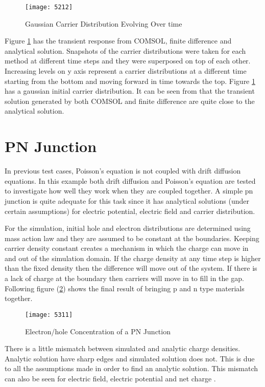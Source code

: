 \begin{doublespace}
\begin{figure}[ht]
\centering
\texttt{[image: 5212]}
\caption{Gaussian Carrier Distribution Evolving Over time} 
\label{51}
\end{figure}

Figure \ref{51} has the transient response from COMSOL, finite difference and analytical solution. Snapshots of the carrier distributions were taken for each method at different time steps and they were superposed on top of each other. Increasing levels on y axis represent a carrier distributions at a different time starting from the bottom and moving forward in time towards the top. Figure \ref{51} has a gaussian initial carrier distribution. It can be seen from that the transient solution generated by both COMSOL and finite difference are quite close to the analytical solution.


\clearpage
\section{PN Junction}
In previous test cases, Poisson's equation is not coupled with drift diffusion equations. In this example both drift diffusion and Poisson's equation are tested to investigate how well they work when they are coupled together. A simple pn junction is quite adequate for this task since it has analytical solutions (under certain assumptions) for electric potential, electric field and carrier distribution.

For the simulation, initial hole and electron distributions are determined using mass action law and they are assumed to be constant at the boundaries. Keeping carrier density constant creates a mechanism in which the charge can move in and out of the simulation domain. If the charge density at any time step is higher than the fixed density then the difference will move out of the system. If there is a lack of charge at the boundary then carriers will move in to fill in the gap. Following figure (\ref{npcon}) shows the final result of bringing p and n type materials together. 
 
\begin{figure}[ht]
\centering
\texttt{[image: 5311]}
\caption{Electron/hole Concentration of a PN Junction} 
\label{npcon}
\end{figure}

There is a little mismatch between simulated and analytic charge densities. Analytic solution have sharp edges and simulated solution does not. This is due to all the assumptions made in order to find an analytic solution. This mismatch can also be seen for electric field, electric potential and net charge .


\end{doublespace}
